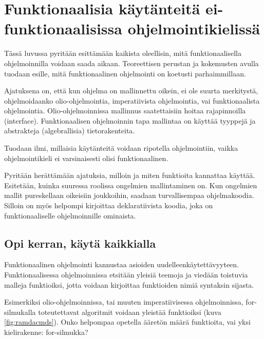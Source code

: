 \vspace{21.5pt}
\chapter{Funktionaalisia käytänteitä ei-funktionaalisissa ohjelmointikielissä}

Tässä luvussa pyritään esittämään kaikista oleellisin, mitä funktionaalisella ohjelmoinnilla voidaan saada aikaan. Teoreettisen perustan ja kokemusten avulla tuodaan esille, mitä funktionaalinen ohjelmointi on koetusti parhaimmillaan.

Ajatuksena on, että kun ohjelma on mallinnettu oikein, ei ole suurta merkitystä, ohjelmoidaanko olio-ohjelmointia, imperatiivista ohjelmointia, vai funktionaalista ohjelmointia. Olio-ohjelmoinnissa mallinnus saatettaisiin hoitaa rajapinnoilla (interface). Funktionaalisen ohjelmoinnin tapa mallintaa on käyttää tyyppejä ja abstrakteja (algebrallisia) tietorakenteita.

Tuodaan ilmi, millaisia käytänteitä voidaan ripotella ohjelmointiin, vaikka ohjelmointikieli ei varsinaisesti olisi funktionaalinen.

Pyritään herättämään ajatuksia, milloin ja miten funktioita kannattaa käyttää. Esitetään, kuinka suuressa roolissa ongelmien mallintaminen on. Kun ongelmien mallit pureskellaan oikeisiin joukkoihin, saadaan turvallisempaa ohjelmakoodia. Silloin on myös helpompi kirjoittaa deklaratiivista koodia, joka on funktionaaliselle ohjelmoinnille ominaista.



\section{Opi kerran, käytä kaikkialla}

Funktionaalinen ohjelmointi kannustaa asioiden uudelleenkäytettävyyteen. Funktionaalisessa ohjelmoinnissa etsitään yleisiä teemoja ja viedään toistuvia malleja funktioiksi, jotta voidaan kirjoittaa funktioiden nimiä syntaksin sijasta.


Esimerkiksi olio-ohjelmoinnissa, tai muuten imperatiivisessa ohjelmoinnissa, for-silmukalla toteutettavat algoritmit voidaan yleistää funktioiksi (kuva \ref{fig:ramdacmds}). Onko helpompaa opetella ääretön määrä funktioita, vai yksi kielirakenne: for-silmukka?

